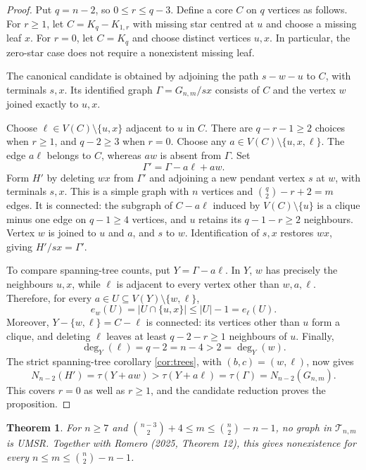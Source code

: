 \documentclass[
  11pt,
]{article}
\newcounter{none} %
\newtheorem{theorem}{Theorem}[section]
\theoremstyle{definition}
\theoremstyle{remark}
\begin{document}
\begin{proof}
Put $q=n-2$, so $0\le r\le q-3$. Define a core $C$ on $q$ vertices as follows. For $r\ge1$, let $C=K_q-K_{1,r}$ with missing star centred at $u$ and choose a missing leaf $x$. For $r=0$, let $C=K_q$ and choose distinct vertices $u,x$. In particular, the zero-star case does not require a nonexistent missing leaf.

The canonical candidate is obtained by adjoining the path $s-w-u$ to $C$, with terminals $s,x$. Its identified graph $\Gamma=G_{n,m}/sx$ consists of $C$ and the vertex $w$ joined exactly to $u,x$.

Choose $\ell\in V(C)\setminus\{u,x\}$ adjacent to $u$ in $C$. There are $q-r-1\ge2$ choices when $r\ge1$, and $q-2\ge3$ when $r=0$. Choose any $a\in V(C)\setminus\{u,x,\ell\}$. The edge $a\ell$ belongs to $C$, whereas $aw$ is absent from $\Gamma$. Set
$$\Gamma'=\Gamma-a\ell+aw.$$
Form $H'$ by deleting $wx$ from $\Gamma'$ and adjoining a new pendant vertex $s$ at $w$, with terminals $s,x$. This is a simple graph with $n$ vertices and $\binom q2-r+2=m$ edges. It is connected: the subgraph of $C-a\ell$ induced by $V(C)\setminus\{u\}$ is a clique minus one edge on $q-1\ge4$ vertices, and $u$ retains its $q-1-r\ge2$ neighbours. Vertex $w$ is joined to $u$ and $a$, and $s$ to $w$. Identification of $s,x$ restores $wx$, giving $H'/sx=\Gamma'$.

To compare spanning-tree counts, put $Y=\Gamma-a\ell$. In $Y$, $w$ has precisely the neighbours $u,x$, while $\ell$ is adjacent to every vertex other than $w,a,\ell$. Therefore, for every $a\in U\subseteq V(Y)\setminus\{w,\ell\}$,
$$e_w(U)=|U\cap\{u,x\}|\le |U|-1=e_\ell(U).$$
Moreover, $Y-\{w,\ell\}=C-\ell$ is connected: its vertices other than $u$ form a clique, and deleting $\ell$ leaves at least $q-2-r\ge1$ neighbours of $u$. Finally,
$$\deg_Y(\ell)=q-2=n-4>2=\deg_Y(w).$$
The strict spanning-tree corollary \ref{cor:trees}, with $(b,c)=(w,\ell)$, now gives
$$N_{n-2}(H')=\tau(Y+aw)>\tau(Y+a\ell)=\tau(\Gamma)=N_{n-2}(G_{n,m}).$$
This covers $r=0$ as well as $r\ge1$, and the candidate reduction proves the proposition.
\end{proof}

\begin{theorem}\label{thm:A}
For $n\ge7$ and $\binom{n-3}2+4\le m\le\binom n2-n-1$, no graph in $\mathcal T_{n,m}$ is UMSR. Together with Romero (2025, Theorem 12), this gives nonexistence for every $n\le m\le\binom n2-n-1$.
\end{theorem}
\end{document}

